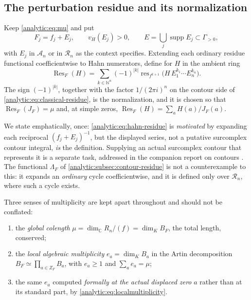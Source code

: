 \documentclass[11pt,letterpaper]{article}
\theoremstyle{definition}
\theoremstyle{remark}
\newcommand{\C}{\mathbb C}
\newcommand{\N}{\mathbb N}
\newcommand{\A}{\mathscr A}
\newcommand{\RR}{\mathscr R}
\newcommand{\Res}{\operatorname{Res}}
\newcommand{\res}{\operatorname{res}}
\newcommand{\supp}{\operatorname{supp}}
\newcommand{\vH}{v_{\!H}}
\numberwithin{equation}{section}
\begin{document}
\subsection{The perturbation residue and its normalization}
\label{analytic:subsec:normalization}
Keep \eqref{analytic:eq:mu} and put
\begin{equation}\label{analytic:eq:perturbed}
 F_j=f_j+E_j,\qquad \vH(E_j)>0,\qquad
 E=\bigcup_j\supp E_j\subset\Gamma_{>0},
\end{equation}
with $E_j$ in $\A_n$ or in $\RR_n$ as the context specifies. Extending each
ordinary residue functional coefficientwise to Hahn numerators, define for
$H$ in the ambient ring
\begin{equation}\label{analytic:eq:hahn-residue}
 \boxed{\quad
 \Res_F(H)=\sum_{k\in\N^n}(-1)^{|k|}
 \res_{f^{k+1}}\bigl(H\,E_1^{k_1}\cdots E_n^{k_n}\bigr).\quad}
\end{equation}
The sign $(-1)^{|k|}$, together with the factor $1/(2\pi i)^n$ on the
contour side of \eqref{analytic:eq:classical-residue}, is the
normalization, and it is chosen so that $\Res_F(J_F)=\mu$ and, at simple
zeros, $\Res_F(H)=\sum_aH(a)/J_F(a)$.

We state emphatically, once: \eqref{analytic:eq:hahn-residue} is
\emph{motivated} by expanding each reciprocal $(f_j+E_j)^{-1}$, but the
displayed series, not a putative surcomplex contour integral, \emph{is} the
definition. Supplying an actual surcomplex contour that represents it is a
separate task, addressed in the companion report on contours
\cite{Contours}. The functional $\Lambda_F$ of
\cref{analytic:subsec:contour-residue} is not a counterexample to this: it
expands an \emph{ordinary} cycle coefficientwise, and it is defined only
over $\RR_n$, where such a cycle exists.

Three senses of multiplicity are kept apart throughout and should not be
conflated:
\begin{enumerate}
\item the \emph{global colength} $\mu=\dim_\C R_n/(f)=\dim_KB_F$, the total
length, conserved;
\item the \emph{local algebraic multiplicity} $e_a=\dim_KB_a$ in the Artin
decomposition $B_F\simeq\prod_{a\in Z_F}B_a$, with $e_a\ge1$ and
$\sum_ae_a=\mu$;
\item the same $e_a$ computed \emph{formally at the actual displaced zero}
$a$ rather than at its standard part, by
\eqref{analytic:eq:localmultiplicity}.
\end{enumerate}
\end{document}
